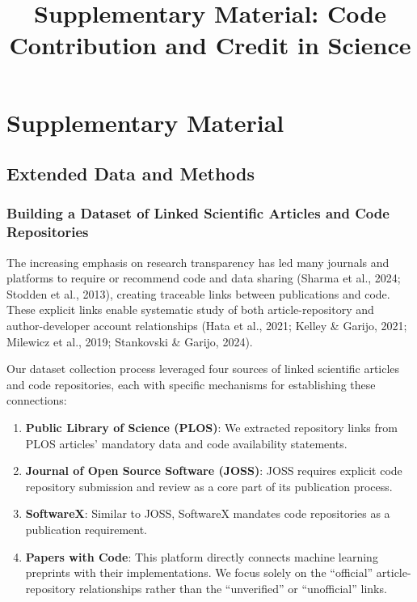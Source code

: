 \documentclass[
  letterpaper,
  DIV=11,
  numbers=noendperiod]{scrartcl}
\title{Supplementary Material: Code Contribution and Credit in Science}
\author{}
\date{}
\providecommand{\tightlist}{%
  \setlength{\itemsep}{0pt}\setlength{\parskip}{0pt}}
\begin{document}
\maketitle


\section{Supplementary Material}\label{supplementary-material}

\subsection{Extended Data and Methods}\label{extended-data-and-methods}

\subsubsection{Building a Dataset of Linked Scientific Articles and Code
Repositories}\label{building-a-dataset-of-linked-scientific-articles-and-code-repositories}

The increasing emphasis on research transparency has led many journals
and platforms to require or recommend code and data sharing (Sharma et
al., 2024; Stodden et al., 2013), creating traceable links between
publications and code. These explicit links enable systematic study of
both article-repository and author-developer account relationships (Hata
et al., 2021; Kelley \& Garijo, 2021; Milewicz et al., 2019; Stankovski
\& Garijo, 2024).

Our dataset collection process leveraged four sources of linked
scientific articles and code repositories, each with specific mechanisms
for establishing these connections:

\begin{enumerate}
\def\labelenumi{\arabic{enumi}.}
\tightlist
\item
  \textbf{Public Library of Science (PLOS)}: We extracted repository
  links from PLOS articles' mandatory data and code availability
  statements.
\item
  \textbf{Journal of Open Source Software (JOSS)}: JOSS requires
  explicit code repository submission and review as a core part of its
  publication process.
\item
  \textbf{SoftwareX}: Similar to JOSS, SoftwareX mandates code
  repositories as a publication requirement.
\item
  \textbf{Papers with Code}: This platform directly connects machine
  learning preprints with their implementations. We focus solely on the
  ``official'' article-repository relationships rather than the
  ``unverified'' or ``unofficial'' links.
\end{enumerate}
\end{document}
